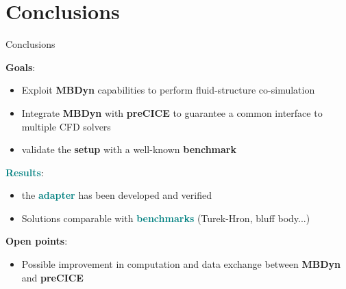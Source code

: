 \documentclass[10pt,t]{beamer}
\begin{document}
\section{Conclusions}

\begin{frame}{Conclusions}


\textcolor{pblue}{\textbf{Goals}}:

\begin{itemize}
    \item Exploit \textcolor{dorange}{\textbf{MBDyn}} capabilities to perform fluid-structure co-simulation
    \item Integrate \textcolor{dorange}{\textbf{MBDyn}} with \textcolor{pblue}{\textbf{preCICE}} to guarantee a common interface to multiple CFD solvers
    \item validate the \textcolor{pblue}{\textbf{setup}} with a well-known \textcolor{pblue}{\textbf{benchmark}}  
\end{itemize}

\pause

\vspace{0.5cm}

\textcolor{teal}{\textbf{Results}}:

\begin{itemize}
    \item the \textcolor{teal}{\textbf{adapter}} has been developed and verified
    \item Solutions comparable with \textcolor{teal}{\textbf{benchmarks}} (Turek-Hron, bluff body...)
\end{itemize}

\pause

\vspace{0.5cm}

\textcolor{dorange}{\textbf{Open points}}:

\begin{itemize}
    \item Possible improvement in computation and data exchange between \textcolor{dorange}{\textbf{MBDyn}} and \textcolor{pblue}{\textbf{preCICE}} 
\end{itemize}



\end{frame}
\end{document}

